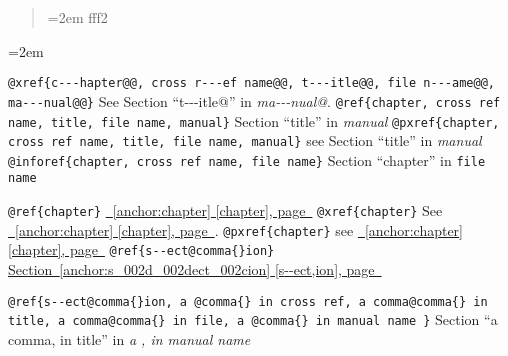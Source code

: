 \documentclass{book}
\newenvironment{GNUTexinfopreformatted}{%
  \par\begingroup\obeylines\obeyspaces\frenchspacing}{\endgroup}
\begin{document}
%
\begin{quote}
\unskip{\parskip=0pt\noindent}%
\begin{GNUTexinfopreformatted}
\leftskip=2em \parskip=0pt \parindent=0pt \ttfamily%
fff2
\end{GNUTexinfopreformatted}
\end{quote}
\begin{GNUTexinfopreformatted}
\leftskip=2em \parskip=0pt \parindent=0pt \ttfamily%


\texttt{@xref\{c{-}{-}{-}hapter@@, cross r{-}{-}{-}ef name@@, t{-}{-}{-}itle@@, file n{-}{-}{-}ame@@, ma{-}{-}{-}nual@@\}} See Section ``t{-}{-}{-}itle@'' in \textsl{ma{-}{-}{-}nual@}.
\texttt{@ref\{chapter, cross ref name, title, file name, manual\}} Section ``title'' in \textsl{manual}
\texttt{@pxref\{chapter, cross ref name, title, file name, manual\}} see Section ``title'' in \textsl{manual}
\texttt{@inforef\{chapter, cross ref name, file name\}} Section ``chapter'' in \texttt{file name}

\texttt{@ref\{chapter\}} \hyperref[anchor:chapter]{\chaptername~\ref*{anchor:chapter} [chapter], page~\pageref*{anchor:chapter}}
\texttt{@xref\{chapter\}} See \hyperref[anchor:chapter]{\chaptername~\ref*{anchor:chapter} [chapter], page~\pageref*{anchor:chapter}}.
\texttt{@pxref\{chapter\}} see \hyperref[anchor:chapter]{\chaptername~\ref*{anchor:chapter} [chapter], page~\pageref*{anchor:chapter}}
\texttt{@ref\{s{-}{-}ect@comma\{\}ion\}} \hyperref[anchor:s_002d_002dect_002cion]{Section~\ref*{anchor:s_002d_002dect_002cion} [s{-}{-}ect,ion], page~\pageref*{anchor:s_002d_002dect_002cion}}

\texttt{@ref\{s{-}{-}ect@comma\{\}ion, a @comma\{\} in cross
ref, a comma@comma\{\} in title, a comma@comma\{\} in file, a @comma\{\} in manual name \}}
Section ``a comma, in title'' in \textsl{a , in manual name}


\end{GNUTexinfopreformatted}
\end{document}

